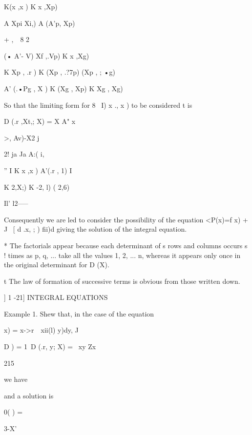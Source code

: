 K(x ,x )  K x ,Xp) 

A  Xpi Xi,) A (A'p, Xp) 



+  ,\ \  8  2 



 (• A'- V)   Xf ,.Vp) K x ,Xg) 

K  Xp , .r ) K (Xp , .?7p)   (Xp , ; •g) 

A' (.•Pg , X )  K (Xg , Xp) K  Xg , Xg) 

So that the limiting form for 8~  I)  x ., x ) to be considered t is 



D (.r  ,Xt,; X) = X A"  x  



>, Av)-X2 j 

2! ja Ja A:( i, 



'' I K x ,x ) A'(.r ,  1) I 



K  2,X;) K  -2, l)  ( 2,6) 



 Il' l2----- 



Consequently we are led to consider the possibility of the equation 
<P(x)=f x) + J  \ [ d .x, ;  ) fii)d  
giving the solution of the integral equation. 

* The factorials appear because each determinant of s rows and columns occurs s ! times as 
p, q, ... take all the values 1, 2, ... n, whereas it appears only once in the original determinant 
for D  (X). 

t The law of formation of successive terms is obvious from those written down. 



] 1 -21] INTEGRAL EQUATIONS 

Example 1. Shew that, in the case of the equation 

  x) = x->r\ \ xii(l) y)dy, 
J 

D  )  =  1\, D (.r, y; X) = \ xy 
Zx 



215 



we have 

and a solution is 



0( ) = 



3-X' 




